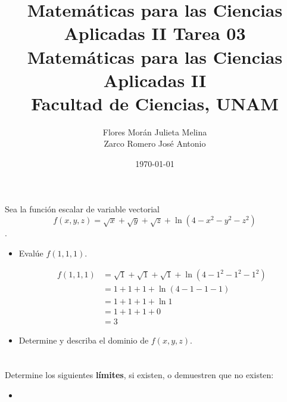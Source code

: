 \documentclass[12pt]{article}
\title{Matemáticas para las Ciencias Aplicadas II}
\title{
        \textbf{Tarea 03} \\
        \vspace{1ex}
        \large Matemáticas para las Ciencias Aplicadas II \\
        Facultad de Ciencias, UNAM}
\date{\today}
\author{Flores Morán Julieta Melina \\ Zarco Romero José Antonio}
\begin{document}
\maketitle

\section{}

Sea la función escalar de variable vectorial $$f(x,y,z)= \sqrt{x} +\sqrt{y} +\sqrt{z} + \ln{(4-x^2-y^2-z^2)}$$.

\begin{itemize}[format=\textbf]

\item Evalúe $f(1,1,1)$.

\begin{align*}
f(1,1,1)
&= \sqrt{1} +\sqrt{1} +\sqrt{1} + \ln{(4-1^2-1^2-1^2)} \\
&= 1+1+1+ \ln{(4-1-1-1)} \\
&= 1+1+1+ \ln{1} \\
&= 1+1+1+0 \\
&= 3
\end{align*}

\item Determine y describa el dominio de $f(x, y, z)$.

\end{itemize}

\section{}

\section{}

Determine los siguientes \textbf{límites}, si existen, o demuestren que no existen:

\begin{itemize}[format=\textbf]

\item

\end{itemize}
\end{document}
